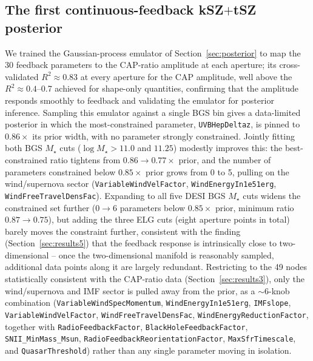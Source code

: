 \documentclass[11pt]{article}
\begin{document}
\subsection{The first continuous-feedback kSZ$+$tSZ posterior}\label{sec:results4}

We trained the Gaussian-process emulator of Section~\ref{sec:posterior} to map
the 30 feedback parameters to the CAP-ratio amplitude at each aperture; its
cross-validated $R^2\approx0.83$ at every aperture for the CAP amplitude, well
above the $R^2\approx0.4$--0.7 achieved for shape-only quantities, confirming
that the amplitude responds smoothly to feedback and validating the emulator
for posterior inference. %
Sampling this emulator against a single BGS bin gives a data-limited posterior
in which the most-constrained parameter, \texttt{UVBHepDeltaz}, is pinned to
$0.86\times$ its prior width, with no parameter strongly constrained.
Jointly fitting both BGS $M_\star$ cuts ($\log M_\star{>}11.0$ and $11.25$)
modestly improves this: the best-constrained ratio tightens from
$0.86\to0.77\times$ prior, and the number of parameters constrained below
$0.85\times$ prior grows from 0 to 5, pulling on the wind/supernova sector
(\texttt{VariableWindVelFactor}, \texttt{WindEnergyIn1e51erg},
\texttt{WindFreeTravelDensFac}). %
Expanding to all five DESI BGS $M_\star$ cuts widens the constrained set
further (0$\to$6 parameters below $0.85\times$ prior, minimum ratio
$0.87\to0.75$), but adding the three ELG cuts (eight aperture points in total)
barely moves the constraint further, consistent with the finding
(Section~\ref{sec:results5}) that the feedback response is intrinsically close
to two-dimensional -- once the two-dimensional manifold is reasonably sampled,
additional data points along it are largely redundant. %
Restricting to the 49 nodes statistically consistent with the CAP-ratio data
(Section~\ref{sec:results3}), only the wind/supernova and IMF sector is pulled
away from the prior, as a $\sim$6-knob combination
(\texttt{VariableWindSpecMomentum}, \texttt{WindEnergyIn1e51erg},
\texttt{IMFslope}, \texttt{VariableWindVelFactor},
\texttt{WindFreeTravelDensFac}, \texttt{WindEnergyReductionFactor}, together
with \texttt{RadioFeedbackFactor}, \texttt{BlackHoleFeedbackFactor},
\texttt{SNII\_MinMass\_Msun}, \texttt{RadioFeedbackReorientationFactor},
\texttt{MaxSfrTimescale}, and \texttt{QuasarThreshold}) rather than any single
parameter moving in isolation. %
\end{document}
